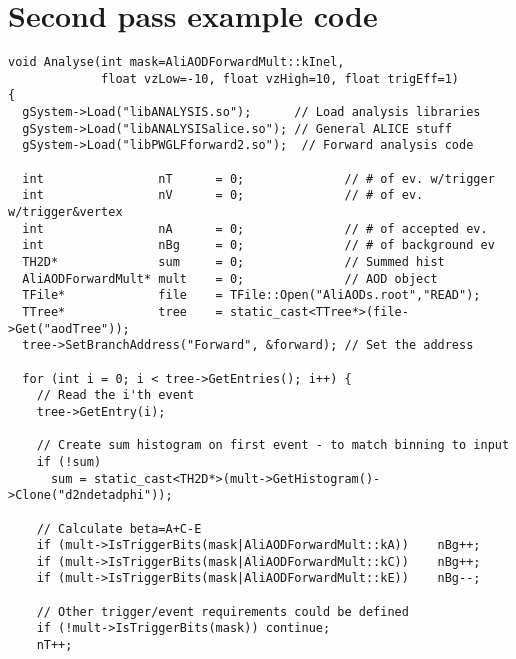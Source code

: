 \documentclass[11pt]{article}
\newcommand{\mult}[1][]{\ensuremath N_{\text{ch}#1}}
\newcommand{\dndeta}[1][]{{\ensuremath%
    \ifx|#1|\else\left.\fi%
    \frac{1}{N}\frac{d\mult{}}{d\eta}%
    \ifx|#1|\else\right|_{#1}\fi%
}}
\begin{document}
\section{Second pass example code}
\label{app:exa_pass2}
\begin{lstlisting}[caption={Example 2\textsuperscript{nd} pass code to
    do $\dndeta$},label={lst:example},frame=single,captionpos=b]
void Analyse(int mask=AliAODForwardMult::kInel,
             float vzLow=-10, float vzHigh=10, float trigEff=1)
{ 
  gSystem->Load("libANALYSIS.so");      // Load analysis libraries
  gSystem->Load("libANALYSISalice.so"); // General ALICE stuff
  gSystem->Load("libPWGLFforward2.so");  // Forward analysis code

  int                nT      = 0;              // # of ev. w/trigger
  int                nV      = 0;              // # of ev. w/trigger&vertex
  int                nA      = 0;              // # of accepted ev.
  int                nBg     = 0;              // # of background ev
  TH2D*              sum     = 0;              // Summed hist
  AliAODForwardMult* mult    = 0;              // AOD object
  TFile*             file    = TFile::Open("AliAODs.root","READ");
  TTree*             tree    = static_cast<TTree*>(file->Get("aodTree"));
  tree->SetBranchAddress("Forward", &forward); // Set the address

  for (int i = 0; i < tree->GetEntries(); i++) { 
    // Read the i'th event 
    tree->GetEntry(i);

    // Create sum histogram on first event - to match binning to input
    if (!sum) 
      sum = static_cast<TH2D*>(mult->GetHistogram()->Clone("d2ndetadphi"));
    
    // Calculate beta=A+C-E
    if (mult->IsTriggerBits(mask|AliAODForwardMult::kA))    nBg++;
    if (mult->IsTriggerBits(mask|AliAODForwardMult::kC))    nBg++;
    if (mult->IsTriggerBits(mask|AliAODForwardMult::kE))    nBg--;

    // Other trigger/event requirements could be defined 
    if (!mult->IsTriggerBits(mask)) continue; 
    nT++;


\end{lstlisting}
\end{document}
